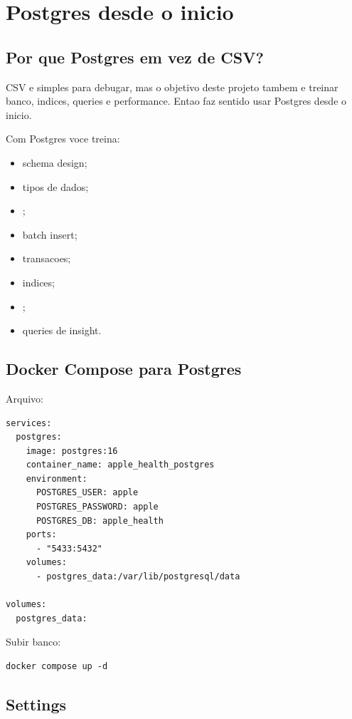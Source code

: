 \chapter{Postgres desde o inicio}

\section{Por que Postgres em vez de CSV?}

CSV e simples para debugar, mas o objetivo deste projeto tambem e treinar banco, indices, queries e performance. Entao faz sentido usar Postgres desde o inicio.

Com Postgres voce treina:

\begin{itemize}
  \item schema design;
  \item tipos de dados;
  \item {};
  \item batch insert;
  \item transacoes;
  \item indices;
  \item {};
  \item queries de insight.
\end{itemize}

\section{Docker Compose para Postgres}

Arquivo: 

\begin{lstlisting}[style=devbutterbash]
services:
  postgres:
    image: postgres:16
    container_name: apple_health_postgres
    environment:
      POSTGRES_USER: apple
      POSTGRES_PASSWORD: apple
      POSTGRES_DB: apple_health
    ports:
      - "5433:5432"
    volumes:
      - postgres_data:/var/lib/postgresql/data

volumes:
  postgres_data:
\end{lstlisting}

Subir banco:

\begin{lstlisting}[style=devbutterbash]
docker compose up -d
\end{lstlisting}

\section{Settings}

